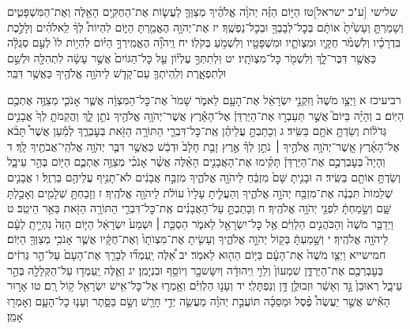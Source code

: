 \documentclass[twoside, openany, parskip=half, 11pt]{book}
\begin{document}
שלישי [ע"כ ישראל]טז הַיּ֣וֹם הַזֶּ֗ה יְהֹוָ֨ה אֱלֹהֶ֜יךָ מְצַוְּךָ֧ לַעֲשׂ֛וֹת אֶת־הַחֻקִּ֥ים הָאֵ֖לֶּה וְאֶת־הַמִּשְׁפָּטִ֑ים וְשָׁמַרְתָּ֤ וְעָשִׂ֙יתָ֙ אוֹתָ֔ם בְּכׇל־לְבָבְךָ֖ וּבְכׇל־נַפְשֶֽׁךָ׃ יז אֶת־יְהֹוָ֥ה הֶאֱמַ֖רְתָּ הַיּ֑וֹם לִהְיוֹת֩ לְךָ֨ לֵֽאלֹהִ֜ים וְלָלֶ֣כֶת בִּדְרָכָ֗יו וְלִשְׁמֹ֨ר חֻקָּ֧יו וּמִצְוֺתָ֛יו וּמִשְׁפָּטָ֖יו וְלִשְׁמֹ֥עַ בְּקֹלֽוֹ׃ יח וַֽיהֹוָ֞ה הֶאֱמִֽירְךָ֣ הַיּ֗וֹם לִהְי֥וֹת לוֹ֙ לְעַ֣ם סְגֻלָּ֔ה כַּאֲשֶׁ֖ר דִּבֶּר־לָ֑ךְ וְלִשְׁמֹ֖ר כׇּל־מִצְוֺתָֽיו׃ יט וּֽלְתִתְּךָ֣ עֶלְי֗וֹן עַ֤ל כׇּל־הַגּוֹיִם֙ אֲשֶׁ֣ר עָשָׂ֔ה לִתְהִלָּ֖ה וּלְשֵׁ֣ם וּלְתִפְאָ֑רֶת וְלִֽהְיֹתְךָ֧ עַם־קָדֹ֛שׁ לַיהֹוָ֥ה אֱלֹהֶ֖יךָ כַּאֲשֶׁ֥ר דִּבֵּֽר׃

רביעיכז א וַיְצַ֤ו מֹשֶׁה֙ וְזִקְנֵ֣י יִשְׂרָאֵ֔ל אֶת־הָעָ֖ם לֵאמֹ֑ר שָׁמֹר֙ אֶת־כׇּל־הַמִּצְוָ֔ה אֲשֶׁ֧ר אָנֹכִ֛י מְצַוֶּ֥ה אֶתְכֶ֖ם הַיּֽוֹם׃ ב וְהָיָ֗ה בַּיּוֹם֮ אֲשֶׁ֣ר תַּעַבְר֣וּ אֶת־הַיַּרְדֵּן֒ אֶל־הָאָ֕רֶץ אֲשֶׁר־יְהֹוָ֥ה אֱלֹהֶ֖יךָ נֹתֵ֣ן לָ֑ךְ וַהֲקֵמֹתָ֤ לְךָ֙ אֲבָנִ֣ים גְּדֹל֔וֹת וְשַׂדְתָּ֥ אֹתָ֖ם בַּשִּֽׂיד׃ ג וְכָתַבְתָּ֣ עֲלֵיהֶ֗ן אֶֽת־כׇּל־דִּבְרֵ֛י הַתּוֹרָ֥ה הַזֹּ֖את בְּעׇבְרֶ֑ךָ לְמַ֡עַן אֲשֶׁר֩ תָּבֹ֨א אֶל־הָאָ֜רֶץ אֲֽשֶׁר־יְהֹוָ֥ה אֱלֹהֶ֣יךָ ׀ נֹתֵ֣ן לְךָ֗ אֶ֣רֶץ זָבַ֤ת חָלָב֙ וּדְבַ֔שׁ כַּאֲשֶׁ֥ר דִּבֶּ֛ר יְהֹוָ֥ה אֱלֹהֵֽי־אֲבֹתֶ֖יךָ לָֽךְ׃ ד וְהָיָה֮ בְּעׇבְרְכֶ֣ם אֶת־הַיַּרְדֵּן֒ תָּקִ֜ימוּ אֶת־הָאֲבָנִ֣ים הָאֵ֗לֶּה אֲשֶׁ֨ר אָנֹכִ֜י מְצַוֶּ֥ה אֶתְכֶ֛ם הַיּ֖וֹם בְּהַ֣ר עֵיבָ֑ל וְשַׂדְתָּ֥ אוֹתָ֖ם בַּשִּֽׂיד׃ ה וּבָנִ֤יתָ שָּׁם֙ מִזְבֵּ֔חַ לַיהֹוָ֖ה אֱלֹהֶ֑יךָ מִזְבַּ֣ח אֲבָנִ֔ים לֹא־תָנִ֥יף עֲלֵיהֶ֖ם בַּרְזֶֽל׃ ו אֲבָנִ֤ים שְׁלֵמוֹת֙ תִּבְנֶ֔ה אֶת־מִזְבַּ֖ח יְהֹוָ֣ה אֱלֹהֶ֑יךָ וְהַעֲלִ֤יתָ עָלָיו֙ עוֹלֹ֔ת לַיהֹוָ֖ה אֱלֹהֶֽיךָ׃ ז וְזָבַחְתָּ֥ שְׁלָמִ֖ים וְאָכַ֣לְתָּ שָּׁ֑ם וְשָׂ֣מַחְתָּ֔ לִפְנֵ֖י יְהֹוָ֥ה אֱלֹהֶֽיךָ׃ ח וְכָתַבְתָּ֣ עַל־הָאֲבָנִ֗ים אֶֽת־כׇּל־דִּבְרֵ֛י הַתּוֹרָ֥ה הַזֹּ֖את בַּאֵ֥ר הֵיטֵֽב׃
ט וַיְדַבֵּ֤ר מֹשֶׁה֙ וְהַכֹּהֲנִ֣ים הַלְוִיִּ֔ם אֶ֥ל כׇּל־יִשְׂרָאֵ֖ל לֵאמֹ֑ר הַסְכֵּ֤ת ׀ וּשְׁמַע֙ יִשְׂרָאֵ֔ל הַיּ֤וֹם הַזֶּה֙ נִהְיֵ֣יתָֽ לְעָ֔ם לַיהֹוָ֖ה אֱלֹהֶֽיךָ׃ י וְשָׁ֣מַעְתָּ֔ בְּק֖וֹל יְהֹוָ֣ה אֱלֹהֶ֑יךָ וְעָשִׂ֤יתָ אֶת־מִצְוֺתָו֙ וְאֶת־חֻקָּ֔יו אֲשֶׁ֛ר אָנֹכִ֥י מְצַוְּךָ֖ הַיּֽוֹם׃
חמישייא וַיְצַ֤ו מֹשֶׁה֙ אֶת־הָעָ֔ם בַּיּ֥וֹם הַה֖וּא לֵאמֹֽר׃ יב אֵ֠לֶּה יַֽעַמְד֞וּ לְבָרֵ֤ךְ אֶת־הָעָם֙ עַל־הַ֣ר גְּרִזִ֔ים בְּעׇבְרְכֶ֖ם אֶת־הַיַּרְדֵּ֑ן שִׁמְעוֹן֙ וְלֵוִ֣י וִֽיהוּדָ֔ה וְיִשָּׂשכָ֖ר וְיוֹסֵ֥ף וּבִנְיָמִֽן׃ יג וְאֵ֛לֶּה יַֽעַמְד֥וּ עַל־הַקְּלָלָ֖ה בְּהַ֣ר עֵיבָ֑ל רְאוּבֵן֙ גָּ֣ד וְאָשֵׁ֔ר וּזְבוּלֻ֖ן דָּ֥ן וְנַפְתָּלִֽי׃ יד וְעָנ֣וּ הַלְוִיִּ֗ם וְאָ֥מְר֛וּ אֶל־כׇּל־אִ֥ישׁ יִשְׂרָאֵ֖ל ק֥וֹל רָֽם׃
טו אָר֣וּר הָאִ֡ישׁ אֲשֶׁ֣ר יַעֲשֶׂה֩ פֶ֨סֶל וּמַסֵּכָ֜ה תּוֹעֲבַ֣ת יְהֹוָ֗ה מַעֲשֵׂ֛ה יְדֵ֥י חָרָ֖שׁ וְשָׂ֣ם בַּסָּ֑תֶר וְעָנ֧וּ כׇל־הָעָ֛ם וְאָמְר֖וּ אָמֵֽן׃
\end{document}
